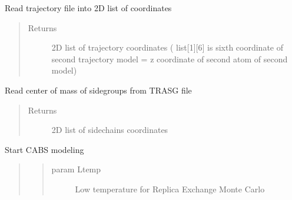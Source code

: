 \documentclass[letterpaper,10pt,english]{sphinxmanual}
\begin{document}
\begin{fulllineitems}
\begin{fulllineitems}
\begin{quote}
\begin{description}
\end{description}\end{quote}

\end{fulllineitems}


\begin{fulllineitems}
\label{api:pycabs.CABS.getTraCoordinates}
Read trajectory file into 2D list of coordinates
\begin{quote}\begin{description}
\item[{Returns}] \leavevmode
2D list of trajectory coordinates ( list{[}1{]}{[}6{]} is sixth coordinate of second trajectory model = z coordinate of second atom of second model)

\end{description}\end{quote}

\end{fulllineitems}


\begin{fulllineitems}
\label{api:pycabs.CABS.loadSGCoordinates}
Read center of mass of sidegroups from TRASG file
\begin{quote}\begin{description}
\item[{Returns}] \leavevmode
2D list of sidechains coordinates

\end{description}\end{quote}

\end{fulllineitems}


\begin{fulllineitems}
\label{api:pycabs.CABS.modeling}
Start CABS modeling
\begin{quote}
\begin{quote}\begin{description}
\item[{param Ltemp}] \leavevmode
Low temperature for Replica Exchange Monte Carlo


\end{description}
\end{quote}
\end{quote}
\end{fulllineitems}
\end{fulllineitems}
\end{document}
